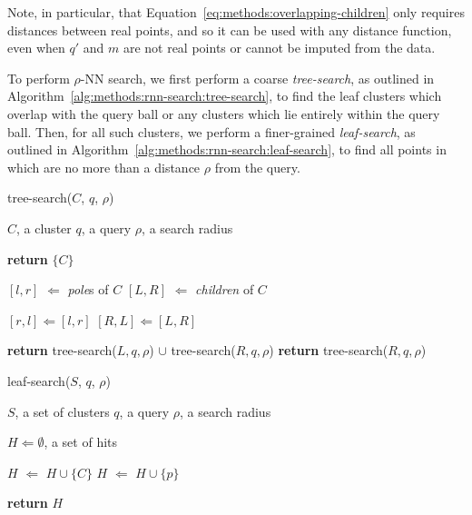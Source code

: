 Note, in particular, that Equation~\ref{eq:methods:overlapping-children} only requires distances between real points, and so it can be used with any distance function, even when $q'$ and $m$ are not real points or cannot be imputed from the data.

To perform $\rho$-NN search, we first perform a coarse \textit{tree-search}, as outlined in Algorithm~\ref{alg:methods:rnn-search:tree-search}, to find the leaf clusters which overlap with the query ball or any clusters which lie entirely within the query ball.
Then, for all such clusters, we perform a finer-grained \textit{leaf-search}, as outlined in Algorithm~\ref{alg:methods:rnn-search:leaf-search}, to find all points in which are no more than a distance $\rho$ from the query.

\begin{algorithm} 
    \caption{tree-search($C$, $q$, $\rho$)} 
    \label{alg:methods:rnn-search:tree-search} 
    \begin{algorithmic}
        \REQUIRE $C$, a cluster
        \REQUIRE $q$, a query
        \REQUIRE $\rho$, a search radius

            \STATE \textbf{return} $\{C\}$
        \ELSE

            \STATE $[l, r]$ $\Leftarrow$ \textit{pole}s of $C$
            \STATE $[L, R]$ $\Leftarrow$ \textit{children} of $C$

                \STATE $[r, l] \Leftarrow [l, r]$
                \STATE $[R, L] \Leftarrow [L, R]$
            \ENDIF

                \STATE \textbf{return} tree-search($L, q, \rho$) $\cup$ tree-search($R, q, \rho$)
            \ELSE
                \STATE \textbf{return} tree-search($R, q, \rho$)
            \ENDIF
        \ENDIF
    \end{algorithmic}
\end{algorithm}

\begin{algorithm} 
    \caption{leaf-search($S$, $q$, $\rho$)} 
    \label{alg:methods:rnn-search:leaf-search} 
    \begin{algorithmic}
        \REQUIRE $S$, a set of clusters
        \REQUIRE $q$, a query
        \REQUIRE $\rho$, a search radius

        \STATE $H \Leftarrow \emptyset$, a set of hits

                \STATE $H$ $\Leftarrow$ $H \cup \{C\}$
            \ELSE
                        \STATE $H$ $\Leftarrow$ $H \cup \{p\}$
                    \ENDIF
                \ENDFOR
            \ENDIF
        \ENDFOR

        \STATE \textbf{return} $H$
    \end{algorithmic}
\end{algorithm}

